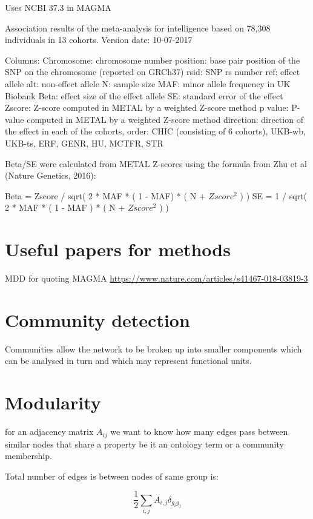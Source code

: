 Uses NCBI 37.3 in MAGMA

     Association results of the meta-analysis for intelligence based on 78,308 individuals in 13 cohorts. 
     Version date: 10-07-2017

  Columns:
Chromosome: chromosome number
position: base pair position of the SNP on the chromosome (reported on GRCh37)
rsid: SNP rs number
ref: effect allele
alt: non-effect allele
N: sample size
MAF: minor allele frequency in UK Biobank
Beta: effect size of the effect allele
SE: standard error of the effect
Zscore: Z-score computed in METAL by a weighted Z-score method
p   value: P-value computed in METAL by a weighted Z-score method
direction: direction of the effect in each of the cohorts, order: CHIC (consisting of 6 cohorts), UKB-wb, UKB-ts, ERF, GENR, HU, MCTFR, STR

Beta/SE were calculated from METAL Z-scores using the formula from Zhu et al (Nature Genetics, 2016):

Beta = Zscore / sqrt( 2 * MAF * ( 1 - MAF) * ( N + $Zscore^2$ ) )
SE = 1 / sqrt( 2 * MAF * ( 1 - MAF ) * ( N + $Zscore^2$ ) )

\section{Useful papers for methods}

MDD for quoting MAGMA \url{https://www.nature.com/articles/s41467-018-03819-3}

\section{Community detection}

Communities allow the network to be broken up into smaller components which can be analysed in turn and which may represent functional units.


\section{Modularity}
\label{sec:modularity definition}

for an adjacency matrix $A_{ij}$ we want to know how many edges pass between similar nodes that share a property be it an ontology term or a community membership.

Total number of edges is between nodes of same group is:

\begin{equation}
\label{eq:notes_modularity_totaledges}
    \frac{1}{2} \sum_{i,j} A_{i,j}\delta_{g_i g_j}
\end{equation}

